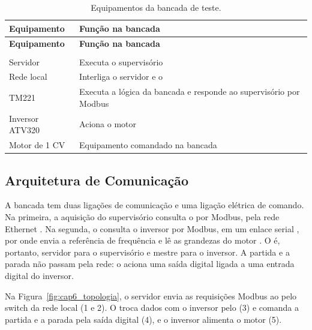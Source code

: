 {\renewcommand{\arraystretch}{1.3}\small
\begin{xltabular}{\textwidth}{>{\centering\arraybackslash}p{4.2cm}>{\centering\arraybackslash}X}
        \caption{Equipamentos da bancada de teste.}
        \label{tab:cap6_equipamentos}\\
        \hline
        \textbf{Equipamento} & \textbf{Função na bancada} \\
        \hline
        \endfirsthead
        \hline
        \textbf{Equipamento} & \textbf{Função na bancada} \\
        \hline
        \endhead
        \endfoot
         \\
        \endlastfoot
        Servidor & Executa o supervisório \\
        \hline
        Rede local & Interliga o servidor e o  \\
        \hline
         TM221 & Executa a lógica da bancada e responde ao supervisório por Modbus \\
        \hline
        Inversor ATV320 & Aciona o motor \\
        \hline
        Motor de 1 CV & Equipamento comandado na bancada \\
        \hline
\end{xltabular}}

\subsection{Arquitetura de Comunicação}

\par A bancada tem duas ligações de comunicação e uma ligação elétrica de comando. Na primeira, a aquisição do supervisório consulta o  por Modbus, pela rede Ethernet \cite{MODBUS_TCP_IMPLEMENTATION_GUIDE}. Na segunda, o  consulta o inversor por Modbus, em um enlace serial , por onde envia a referência de frequência e lê as grandezas do motor \cite{MODBUS_SERIAL_SPEC}. O  é, portanto, servidor para o supervisório e mestre para o inversor. A partida e a parada não passam pela rede: o  aciona uma saída digital ligada a uma entrada digital do inversor.

\par Na Figura~\ref{fig:cap6_topologia}, o servidor envia as requisições Modbus ao  pelo switch da rede local (1 e 2). O  troca dados com o inversor pelo  (3) e comanda a partida e a parada pela saída digital (4), e o inversor alimenta o motor (5).

